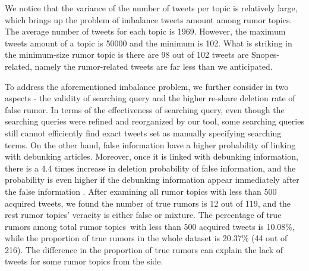 \documentclass[conference]{IEEEtran}
\begin{document}
	We notice that the variance of the number of tweets per topic is relatively large, which brings up the problem of imbalance tweets amount among rumor topics. The average number of tweets for each topic is 1969. However, the maximum tweets amount of a topic is 50000 and the minimum is 102. What is striking in the minimum-size rumor topic is there are 98 out of 102 tweets are Snopes-related, namely the rumor-related tweets are far less than we anticipated. 
	
	To address the aforementioned imbalance problem, we further consider in two aspects - the validity of searching query and the higher re-share deletion rate of false rumor. In terms of the effectiveness of searching query, even though the searching queries were refined and reorganized by our tool, some searching queries still cannot efficiently find exact tweets set as manually specifying searching terms. On the other hand, false information have a higher probability of linking with debunking articles. Moreover, once it is linked with debunking information, there is a 4.4 times increase in deletion probability of false information, and the probability is even higher if the debunking information appear immediately after the false information \cite{friggeri2014rumor}. After examining all rumor topics with less than 500 acquired tweets, we found the number of true rumors is 12 out of 119, and the rest rumor topics' veracity is either false or mixture. The percentage of true rumors among total rumor topics with less than 500 acquired tweets is 10.08\%, while the proportion of true rumors in the whole dataset is 20.37\% (44 out of 216). The difference in the proportion of true rumors can explain the lack of tweets for some rumor topics from the side.
	
\end{document}
